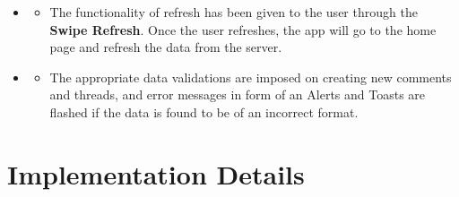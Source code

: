 \documentclass[12pt]{article}
\begin{document}
\begin{itemize}
\item \begin{itemize}

    \item The functionality of refresh has been given to the user through the \textbf{Swipe Refresh}. Once the user refreshes, the app will go to the home page and refresh the data from the server.
    
    \end{itemize}
\item 
\begin{itemize}
    \item The appropriate data validations are imposed on creating new comments and threads, and error messages in form of an Alerts and Toasts are flashed if the data is found to be of an incorrect format.  
\end{itemize}
\end{itemize}

\section{Implementation Details~\cite{developer_android}~\cite{stack_overflow}}
\end{document}
